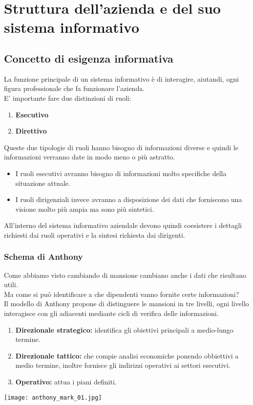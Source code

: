 \documentclass[../main.tex]{subfiles}
\begin{document}
	\chapter{Struttura dell'azienda e del suo sistema informativo}
	\section{Concetto di esigenza informativa}
	La funzione principale di un sistema informativo è di interagire, aiutandi, ogni figura professionale che fa funzionare l'azienda.\\
	E' importante fare due distinzioni di ruoli:
	\begin{enumerate}
		\item \textbf{Esecutivo}
		\item \textbf{Direttivo}
	\end{enumerate}
	Queste due tipologie di ruoli hanno bisogno di informazioni diverse e quindi le informazioni verranno date in modo meno o più astratto.
	\begin{itemize}
		\item I ruoli esecutivi avranno bisogno di informazioni molto specifiche della situazione attuale.
		\item I ruoli dirigenziali invece avranno a disposizione dei dati che forniscono una visione molto più ampia ma sono più sintetici.
	\end{itemize}
	All'interno del sistema informativo aziendale devono quindi coesistere i dettagli richiesti dai ruoli operativi e la sintesi richiesta dai dirigenti.

	\subsection{Schema di Anthony}
	Come abbiamo visto cambiando di mansione cambiano anche i dati che risultano utili.\\
	Ma come si può identificare a che dipendenti vanno fornite certe informazioni?\\
	Il modello di Anthony propone di distinguere le mansioni in tre livelli, ogni livello interagisce con gli adiacenti mediante cicli di verifica delle informazioni.
	\begin{enumerate}
		\item \textbf{Direzionale strategico:} identifica gli obiettivi principali a medio-lungo termine.
		\item \textbf{Direzionale tattico:} che compie analisi economiche ponendo obbiettivi a medio termine, inoltre fornisce gli indirizzi operativi ai settori esecutivi.
		\item \textbf{Operativo:} attua i piani definiti.
	\end{enumerate}
	\begin{center}
		\texttt{[image: anthony\_mark\_01.jpg]}
	\end{center}
\end{document}
